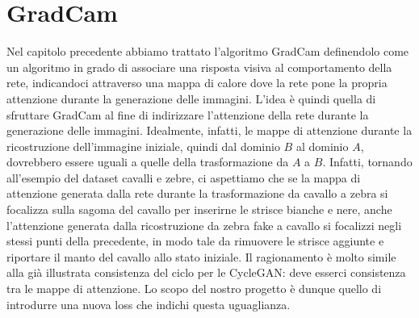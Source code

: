 \section{GradCam}
Nel capitolo precedente abbiamo trattato l'algoritmo GradCam definendolo come un algoritmo in grado di associare una risposta visiva al comportamento della rete, indicandoci attraverso una mappa di calore dove la rete pone la propria attenzione durante la generazione delle immagini. L'idea è quindi quella di sfruttare GradCam al fine di indirizzare l'attenzione della rete durante la generazione delle immagini. Idealmente, infatti, le mappe di attenzione durante la ricostruzione dell'immagine iniziale, quindi dal dominio $B$ al dominio $A$, dovrebbero essere uguali a quelle della trasformazione da $A$ a $B$. Infatti, tornando all'esempio del dataset cavalli e zebre, ci aspettiamo che se la mappa di attenzione generata dalla rete durante la trasformazione da cavallo a zebra si focalizza sulla sagoma del cavallo per inserirne le strisce bianche e nere, anche l'attenzione generata dalla ricostruzione da zebra fake a cavallo si focalizzi negli stessi punti della precedente, in modo tale da rimuovere le strisce aggiunte e riportare il manto del cavallo allo stato iniziale. Il ragionamento è molto simile alla già illustrata consistenza del ciclo per le CycleGAN: deve esserci consistenza tra le mappe di attenzione. Lo scopo del nostro progetto è dunque quello di introdurre una nuova loss che indichi questa uguaglianza. 

